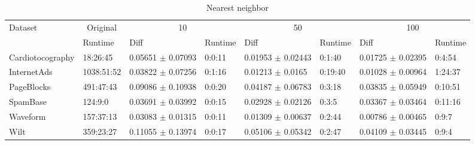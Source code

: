 \documentclass[11pt]{article}
\begin{document}
{\begin{table}[h!]
\footnotesize
\centering
\caption{Nearest neighbor}
\label{tab:nn}
\begin{tabular}{|l|l|ll|ll|ll|}
\hline
\multirow{2}{*}{Dataset} & \multicolumn{1}{c|}{Original} & \multicolumn{2}{c|}{10} & \multicolumn{2}{c|}{50} & \multicolumn{2}{c|}{100}   \\ \cline{2-8} 
                         & Runtime  & Diff                    & Runtime       & Diff                         & Runtime       & Diff      & Runtime          \\ \hline
Cardiotocography  & 18:26:45 & 0.05651 $\pm$ 0.07093 & 0:0:11 & 0.01953 $\pm$ 0.02443 & 0:1:40 & 0.01725 $\pm$ 0.02395 & 0:4:54 \\ 
InternetAds  & 1038:51:52 & 0.03822 $\pm$ 0.07256 & 0:1:16 & 0.01213 $\pm$ 0.0165 & 0:19:40 & 0.01028 $\pm$ 0.00964 & 1:24:37 \\ 
PageBlocks  & 491:47:43 & 0.09086 $\pm$ 0.10938 & 0:0:20 & 0.04187 $\pm$ 0.06783 & 0:3:18 & 0.03835 $\pm$ 0.05949 & 0:10:51 \\ 
SpamBase  & 124:9:0 & 0.03691 $\pm$ 0.03992 & 0:0:15 & 0.02928 $\pm$ 0.02126 & 0:3:5 & 0.03367 $\pm$ 0.03464 & 0:11:16 \\ 
Waveform  & 157:37:13 & 0.03083 $\pm$ 0.01315 & 0:0:11 & 0.01309 $\pm$ 0.00637 & 0:2:44 & 0.00786 $\pm$ 0.00465 & 0:9:7 \\ 
Wilt  & 359:23:27 & 0.11055 $\pm$ 0.13974 & 0:0:17 & 0.05106 $\pm$ 0.05342 & 0:2:47 & 0.04109 $\pm$ 0.03445 & 0:9:4 \\  \hline
\end{tabular}
\end{table}

}
\end{document}

